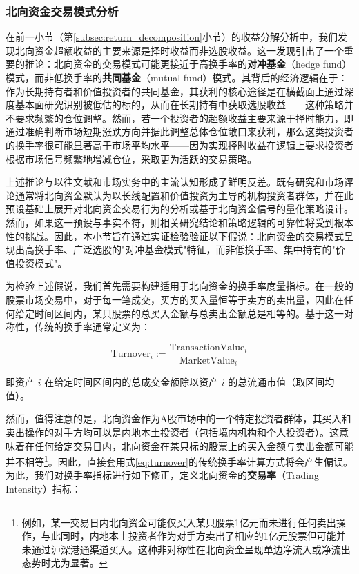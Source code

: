 \documentclass{article}
\begin{document}
\subsubsection{北向资金交易模式分析}
\label{sec:trading_pattern}

在前一小节（第\ref{subsec:return_decomposition}小节）的收益分解分析中，我们发现北向资金超额收益的主要来源是择时收益而非选股收益。这一发现引出了一个重要的推论：北向资金的交易模式可能更接近于高换手率的\textbf{对冲基金}（hedge fund）模式，而非低换手率的\textbf{共同基金}（mutual fund）模式。其背后的经济逻辑在于：作为长期持有者和价值投资者的共同基金，其获利的核心途径是在横截面上通过深度基本面研究识别被低估的标的，从而在长期持有中获取选股收益——这种策略并不要求频繁的仓位调整。然而，若一个投资者的超额收益主要来源于择时能力，即通过准确判断市场短期涨跌方向并据此调整总体仓位敞口来获利，那么这类投资者的换手率很可能显著高于市场平均水平——因为实现择时收益在逻辑上要求投资者根据市场信号频繁地增减仓位，采取更为活跃的交易策略。

上述推论与以往文献和市场实务中的主流认知形成了鲜明反差。既有研究和市场评论通常将北向资金默认为以长线配置和价值投资为主导的机构投资者群体，并在此预设基础上展开对北向资金交易行为的分析或基于北向资金信号的量化策略设计。然而，如果这一预设与事实不符，则相关研究结论和策略逻辑的可靠性将受到根本性的挑战。因此，本小节旨在通过实证检验验证以下假说：北向资金的交易模式呈现出高换手率、广泛选股的"对冲基金模式"特征，而非低换手率、集中持有的"价值投资模式"。

为检验上述假说，我们首先需要构建适用于北向资金的换手率度量指标。在一般的股票市场交易中，对于每一笔成交，买方的买入量恒等于卖方的卖出量，因此在任何给定时间区间内，某只股票的总买入金额与总卖出金额总是相等的。基于这一对称性，传统的换手率通常定义为：

\begin{equation}
    \text{Turnover}_i := \frac{\text{TransactionValue}_i}{\text{MarketValue}_i}
    \label{eq:turnover}
\end{equation}

\noindent 即资产 $i$ 在给定时间区间内的总成交金额除以资产 $i$ 的总流通市值（取区间均值）。

然而，值得注意的是，北向资金作为A股市场中的一个特定投资者群体，其买入和卖出操作的对手方均可以是内地本土投资者（包括境内机构和个人投资者）。这意味着在任何给定交易日内，北向资金在某只标的股票上的买入金额与卖出金额可能并不相等\footnote{例如，某一交易日内北向资金可能仅买入某只股票1亿元而未进行任何卖出操作，与此同时，内地本土投资者作为对手方卖出了相应的1亿元股票但可能并未通过沪深港通渠道买入。这种非对称性在北向资金呈现单边净流入或净流出态势时尤为显著。}。因此，直接套用式\ref{eq:turnover}的传统换手率计算方式将会产生偏误。为此，我们对换手率指标进行如下修正，定义北向资金的\textbf{交易率}（Trading Intensity）指标：
\end{document}
